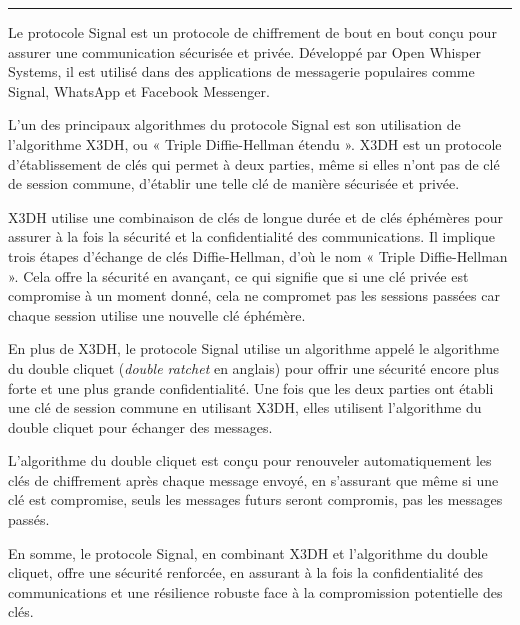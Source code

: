 \hrule
Le protocole Signal est un protocole de chiffrement de bout en bout conçu pour assurer une communication sécurisée et privée. Développé par Open Whisper Systems, il est utilisé dans des applications de messagerie populaires comme Signal, WhatsApp et Facebook Messenger.\par

L'un des principaux algorithmes du protocole Signal est son utilisation de l'algorithme X3DH, ou « Triple Diffie-Hellman étendu ». X3DH est un protocole d'établissement de clés qui permet à deux parties, même si elles n'ont pas de clé de session commune, d'établir une telle clé de manière sécurisée et privée.\par

X3DH utilise une combinaison de clés de longue durée et de clés éphémères pour assurer à la fois la sécurité et la confidentialité des communications. Il implique trois étapes d’échange de clés Diffie-Hellman, d’où le nom « Triple Diffie-Hellman ». Cela offre la sécurité en avançant, ce qui signifie que si une clé privée est compromise à un moment donné, cela ne compromet pas les sessions passées car chaque session utilise une nouvelle clé éphémère.\par

En plus de X3DH, le protocole Signal utilise un algorithme appelé le algorithme du double cliquet (\emph{double ratchet} en anglais) pour offrir une sécurité encore plus forte et une plus grande confidentialité. Une fois que les deux parties ont établi une clé de session commune en utilisant X3DH, elles utilisent l'algorithme du double cliquet pour échanger des messages.\par

L'algorithme du double cliquet est conçu pour renouveler automatiquement les clés de chiffrement après chaque message envoyé, en s'assurant que même si une clé est compromise, seuls les messages futurs seront compromis, pas les messages passés.

En somme, le protocole Signal, en combinant X3DH et l'algorithme du double cliquet, offre une sécurité renforcée, en assurant à la fois la confidentialité des communications et une résilience robuste face à la compromission potentielle des clés.\par




\label{sec:accreditations}



